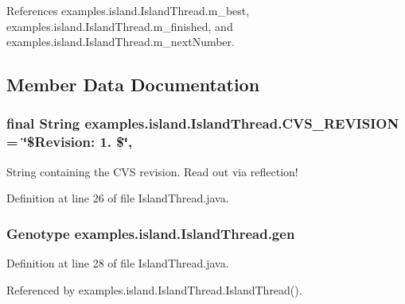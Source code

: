 References examples.\-island.\-Island\-Thread.\-m\-\_\-best, examples.\-island.\-Island\-Thread.\-m\-\_\-finished, and examples.\-island.\-Island\-Thread.\-m\-\_\-next\-Number.



\subsection{Member Data Documentation}
\hypertarget{classexamples_1_1island_1_1_island_thread_a1e891992a69128d40a808b80019b1c3e}{
\subsubsection[{C\-V\-S\-\_\-\-R\-E\-V\-I\-S\-I\-O\-N}]{\setlength{\rightskip}{0pt plus 5cm}final String examples.\-island.\-Island\-Thread.\-C\-V\-S\-\_\-\-R\-E\-V\-I\-S\-I\-O\-N = \char`\"{}\$Revision\-: 1. \$\char`\"{}\hspace{0.3cm}{\ttfamily [static]}, {\ttfamily [private]}}}\label{classexamples_1_1island_1_1_island_thread_a1e891992a69128d40a808b80019b1c3e}
String containing the C\-V\-S revision. Read out via reflection! 

Definition at line 26 of file Island\-Thread.\-java.

\hypertarget{classexamples_1_1island_1_1_island_thread_a2e4604e91489adc609290bf791a2dbb5}{
\subsubsection[{gen}]{\setlength{\rightskip}{0pt plus 5cm}Genotype examples.\-island.\-Island\-Thread.\-gen\hspace{0.3cm}{\ttfamily [private]}}}\label{classexamples_1_1island_1_1_island_thread_a2e4604e91489adc609290bf791a2dbb5}


Definition at line 28 of file Island\-Thread.\-java.



Referenced by examples.\-island.\-Island\-Thread.\-Island\-Thread().

